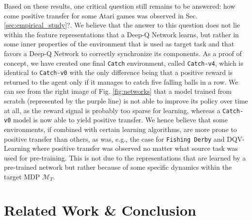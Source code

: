 Based on these results, one critical question still remains to be answered: how come positive transfer for some Atari games was observed in Sec. \ref{sec:empirical_study}?. We believe that the answer to this question does not lie within the feature representations that a Deep-Q Network learns, but rather in some inner properties of the environment that is used as target task and that favors a Deep-Q Network to correctly synchronize its components. As a proof of concept, we have created one final \texttt{Catch} environment, called \texttt{Catch-v4}, which is identical to \texttt{Catch-v0} with the only difference being that a positive reward is returned to the agent only if it manages to catch five falling balls in a row. We can see from the right image of Fig. \ref{fig:networks} that a model trained from scratch (represented by the purple line) is not able to improve its policy over time at all, as the reward signal is probably too sparse for learning, whereas a \texttt{Catch-v0} model is now able to yield positive transfer. We hence believe that some environments, if combined with certain learning algorithms, are more prone to positive transfer than others, as was, e.g., the case for \texttt{Fishing Derby} and DQV-Learning where positive transfer was observed no matter what source task was used for pre-training. This is not due to the representations that are learned by a pre-trained network but rather because of some specific dynamics within the target MDP $\mathcal{M}_T$. 




\section{Related Work \& Conclusion}

